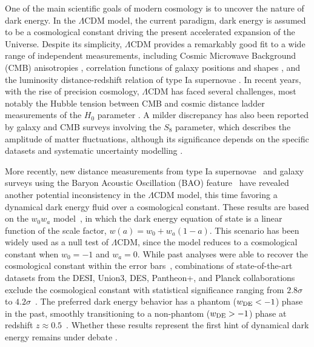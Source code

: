 \documentclass[%
reprint,
superscriptaddress,
preprint numbers,
nofootinbib,
amsmath,amssymb,
aps,
prd
]{revtex4-2}
\begin{document}
One of the main scientific goals of modern cosmology is to uncover the nature of dark energy. In the $\Lambda$CDM model, the current paradigm, dark energy is assumed to be a cosmological constant driving the present accelerated expansion of the Universe. Despite its simplicity, $\Lambda$CDM provides a remarkably good fit to a wide range of independent measurements, including Cosmic Microwave Background (CMB) anisotropies \cite{planck_2018_cmb, planck_pr4_results, act_cmb, act_dr6_results, spt_cmb, spt_3g_2025}, correlation functions of galaxy positions and shapes \cite{kids_legacy, desi_y1_bao, desi_dr2_bao, desi_full_shape, des_y1_3x2, des_y3_3x2, des_y6_3x2, kids-1000-shear, hsc-shear}, and the luminosity distance-redshift relation of type Ia supernovae \cite{pantheon, pantheonplus, desy5, desy5_cosmo, des_dovekie, union3, union3-1}. In recent years, with the rise of precision cosmology, $\Lambda$CDM has faced several challenges, most notably the Hubble tension between CMB and cosmic distance ladder measurements of the $H_0$ parameter \cite{sh0es_hubble, local_dist_network}. A milder discrepancy has also been reported by galaxy and CMB surveys involving the $S_8$ parameter, which describes the amplitude of matter fluctuations, although its significance depends on the specific datasets and systematic uncertainty modelling \cite{kids_legacy, cosmology_intertwined, s8_tension_nonlinear_solution, flamingo_s8, growth_modification_s8}.

More recently, new distance measurements from type Ia supernovae~\cite{pantheonplus, union3, desy5_cosmo, des_dovekie} and galaxy surveys using the Baryon Acoustic Oscillation (BAO) feature~\cite{desi_y1_bao, desi_dr2_bao, desi_full_shape} have revealed another potential inconsistency in the $\Lambda$CDM model, this time favoring a dynamical dark energy fluid over a cosmological constant. These results are based on the $w_0w_a$ model~\cite{linder_w0wa, chevallier_polarski}, in which the dark energy equation of state is a linear function of the scale factor, $w(a) = w_0 + w_a(1-a)$. This scenario has been widely used as a null test of $\Lambda$CDM, since the model reduces to a cosmological constant when $w_0 = -1$ and $w_a = 0$. While past analyses were able to recover the cosmological constant within the error bars~\cite{pantheon, planck_2018_cmb}, combinations of state-of-the-art datasets from the DESI, Union3, DES, Pantheon+, and Planck collaborations exclude the cosmological constant with statistical significance ranging from $2.8\sigma$ to $4.2\sigma$~\cite{desi_dr2_bao, des_dovekie}. The preferred dark energy behavior has a phantom ($w_{\rm DE} < -1$) phase in the past, smoothly transitioning to a non-phantom ($w_{\rm DE} > -1$) phase at redshift $z \approx 0.5$~\cite{desi_crossing, desi_joao, desi_dr2_extensions}. Whether these results represent the first hint of dynamical dark energy remains under debate \cite{liddle_desi, vivian_mirage, desi_dist_duality}.
\end{document}
